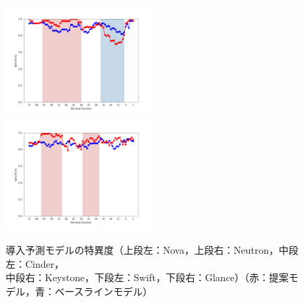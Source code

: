 \documentclass[11pt]{jreport}
\begin{document}
\begin{figure}[H]
\begin{minipage}{\textwidth}
\begin{center}
    \includegraphics[width=0.495\textwidth]{Uenaka_fig/RQ2_result/Swift_merge_Specificity.pdf}
    \includegraphics[width=0.495\textwidth]{Uenaka_fig/RQ2_result/Glance_merge_Specificity.pdf}
    \caption{導入予測モデルの特異度（上段左：Nova，上段右：Neutron，中段左：Cinder，\\ 中段右：Keystone，下段左：Swift，下段右：Glance）（赤：提案モデル，青：ベースラインモデル）}
    \label{fig:merge_spec}
\end{center}
\vspace{0.08\textheight}
\end{minipage}
\end{figure}



\end{document}
